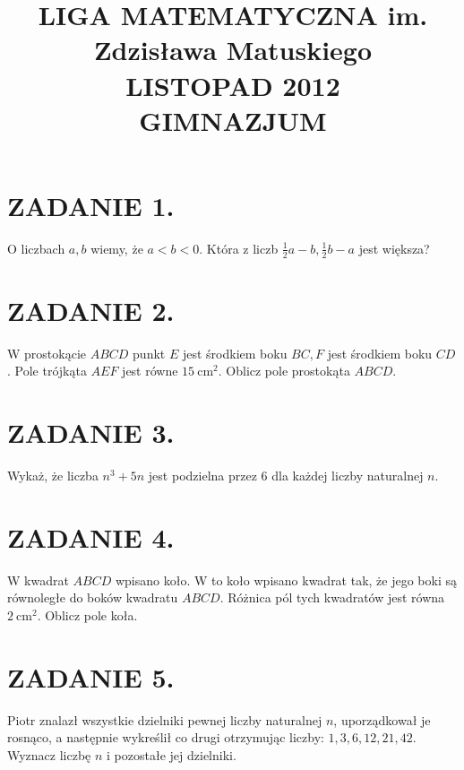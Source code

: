 \documentclass[10pt]{article}
\title{LIGA MATEMATYCZNA im. Zdzisława Matuskiego \\
 LISTOPAD 2012 \\
 GIMNAZJUM }
\author{}
\date{}
\begin{document}
\maketitle
\section*{ZADANIE 1.}
O liczbach \(a, b\) wiemy, że \(a<b<0\). Która z liczb \(\frac{1}{2} a-b, \frac{1}{2} b-a\) jest większa?

\section*{ZADANIE 2.}
W prostokącie \(A B C D\) punkt \(E\) jest środkiem boku \(B C, F\) jest środkiem boku \(C D\). Pole trójkąta \(A E F\) jest równe \(15 \mathrm{~cm}^{2}\). Oblicz pole prostokąta \(A B C D\).

\section*{ZADANIE 3.}
Wykaż, że liczba \(n^{3}+5 n\) jest podzielna przez 6 dla każdej liczby naturalnej \(n\).

\section*{ZADANIE 4.}
W kwadrat \(A B C D\) wpisano koło. W to koło wpisano kwadrat tak, że jego boki są równoległe do boków kwadratu \(A B C D\). Różnica pól tych kwadratów jest równa \(2 \mathrm{~cm}^{2}\). Oblicz pole koła.

\section*{ZADANIE 5.}
Piotr znalazł wszystkie dzielniki pewnej liczby naturalnej \(n\), uporządkował je rosnąco, a następnie wykreślił co drugi otrzymując liczby: \(1,3,6,12,21,42\). Wyznacz liczbę \(n\) i pozostałe jej dzielniki.
\end{document}
